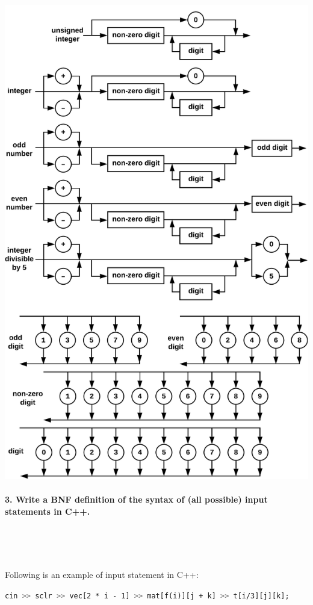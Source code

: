 \documentclass{article}
\begin{document}
		\includegraphics[width=\textwidth-2pt]{noleadingzeroescrop6}
				
	\rmfamily
	
	
	
	
	\paragraph{3. Write a BNF definition of the syntax of (all possible) input statements in C++. }\
	
	\rmfamily\
	
		Following is an example of input statement in C++:
		\newline
	
		\texttt{cin	\lstinline[language=bash]/>>/	sclr	\lstinline[language=bash]/>>/	vec[2 * i - 1]	\lstinline[language=bash]/>>/	mat[f(i)][j + k]	\lstinline[language=bash]/>>/	t[i/3][j][k]; }
	
\end{document}
